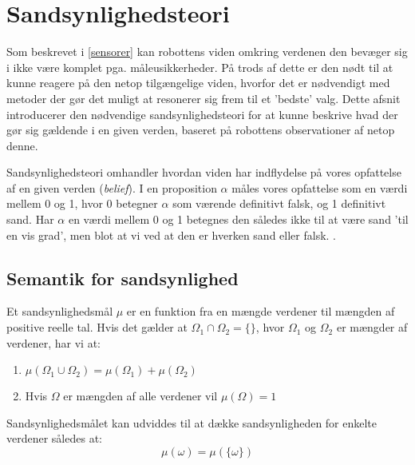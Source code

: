 

\section{Sandsynlighedsteori}
Som beskrevet i \cref{sensorer} kan robottens viden omkring verdenen den bevæger sig i ikke være komplet pga. måleusikkerheder.
På trods af dette er den nødt til at kunne reagere på den netop tilgængelige viden, hvorfor det er nødvendigt med metoder der gør det muligt at resonerer sig frem til et 'bedste' valg.
Dette afsnit introducerer den nødvendige sandsynlighedsteori for at kunne beskrive hvad der gør sig gældende i en given verden, baseret på robottens observationer af netop denne.

Sandsynlighedsteori omhandler hvordan viden har indflydelse på vores opfattelse af en given verden (\textit{belief}).
I en proposition $\alpha$ måles vores opfattelse som en værdi mellem 0 og 1, hvor 0 betegner $\alpha$ som værende definitivt falsk, og 1 definitivt sand.
Har $\alpha$ en værdi mellem 0 og 1 betegnes den således ikke til at være sand 'til en vis grad', men blot at vi ved at den er hverken sand eller falsk.
\cite{ArtificialIntelligence}.

\subsection{Semantik for sandsynlighed}


Et sandsynlighedsmål $\mu$ er en funktion fra en mængde verdener til mængden af positive reelle tal. 
Hvis det gælder at $\Omega_1 \cap \Omega_2 = \{{}\}$, hvor $\Omega_1$ og $\Omega_2$ er mængder af verdener, har vi at:
\begin{enumerate}
\item $\mu(\Omega_1 \cup \Omega_2) = \mu(\Omega_1) + \mu(\Omega_2)$
\item Hvis $\Omega$ er mængden af alle verdener vil $\mu(\Omega) = 1$ 
\end{enumerate}

Sandsynlighedsmålet kan udviddes til at dække sandsynligheden for enkelte verdener således at:
$$\mu(\omega) = \mu(\{\omega\})$$

